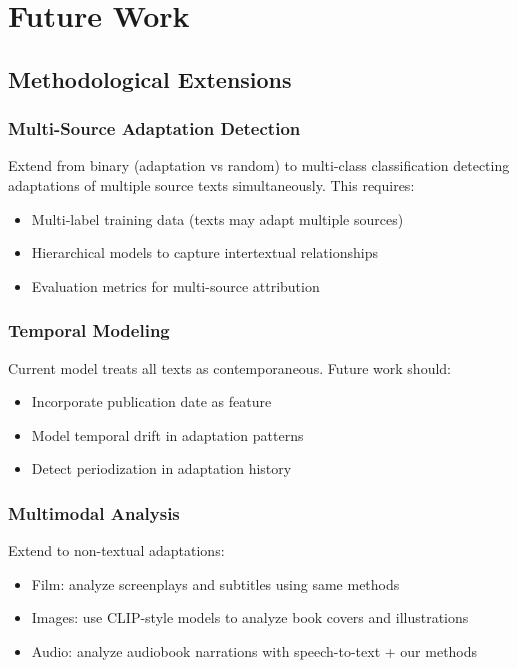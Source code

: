 \documentclass[12pt,a4paper]{article}
\begin{document}
\section{Future Work}

\subsection{Methodological Extensions}

\subsubsection{Multi-Source Adaptation Detection}

Extend from binary (adaptation vs random) to multi-class classification detecting adaptations of multiple source texts simultaneously. This requires:
\begin{itemize}
    \item Multi-label training data (texts may adapt multiple sources)
    \item Hierarchical models to capture intertextual relationships
    \item Evaluation metrics for multi-source attribution
\end{itemize}

\subsubsection{Temporal Modeling}

Current model treats all texts as contemporaneous. Future work should:
\begin{itemize}
    \item Incorporate publication date as feature
    \item Model temporal drift in adaptation patterns
    \item Detect periodization in adaptation history
\end{itemize}

\subsubsection{Multimodal Analysis}

Extend to non-textual adaptations:
\begin{itemize}
    \item Film: analyze screenplays and subtitles using same methods
    \item Images: use CLIP-style models to analyze book covers and illustrations
    \item Audio: analyze audiobook narrations with speech-to-text + our methods
\end{itemize}
\end{document}
